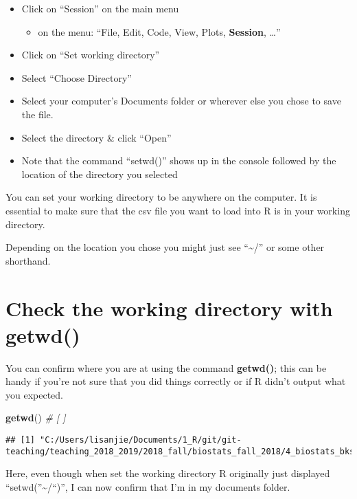 \documentclass[]{book}
\newenvironment{Shaded}{\begin{snugshade}}{\end{snugshade}}
\newcommand{\KeywordTok}[1]{\textcolor[rgb]{0.13,0.29,0.53}{\textbf{#1}}}
\newcommand{\CommentTok}[1]{\textcolor[rgb]{0.56,0.35,0.01}{\textit{#1}}}
\newcommand{\NormalTok}[1]{#1}
\providecommand{\tightlist}{%
  \setlength{\itemsep}{0pt}\setlength{\parskip}{0pt}}
\theoremstyle{definition}
\theoremstyle{definition}
\theoremstyle{definition}
\theoremstyle{remark}
\begin{document}
\begin{itemize}
\tightlist
\item
  Click on ``Session'' on the main menu

  \begin{itemize}
  \tightlist
  \item
    on the menu: ``File, Edit, Code, View, Plots, \textbf{Session},
    \ldots{}''
  \end{itemize}
\item
  Click on ``Set working directory''
\item
  Select ``Choose Directory''
\item
  Select your computer's Documents folder or wherever else you chose to
  save the file.
\item
  Select the directory \& click ``Open''
\item
  Note that the command ``setwd()'' shows up in the console followed by
  the location of the directory you selected
\end{itemize}

You can set your working directory to be anywhere on the computer. It is
essential to make sure that the csv file you want to load into R is in
your working directory.

Depending on the location you chose you might just see
``\textasciitilde{}/'' or some other shorthand.

\section{Check the working directory with
getwd()}\label{check-the-working-directory-with-getwd}

You can confirm where you are at using the command \textbf{getwd()};
this can be handy if you're not sure that you did things correctly or if
R didn't output what you expected.

\begin{Shaded}
\begin{Highlighting}[]
\KeywordTok{getwd}\NormalTok{() }\CommentTok{# [ ]}
\end{Highlighting}
\end{Shaded}

\begin{verbatim}
## [1] "C:/Users/lisanjie/Documents/1_R/git/git-teaching/teaching_2018_2019/2018_fall/biostats_fall_2018/4_biostats_bks_pkg/EDS/EDSbook"
\end{verbatim}

Here, even though when set the working directory R originally just
displayed ``setwd(''\textasciitilde{}/``)'', I can now confirm that I'm
in my documents folder.
\end{document}
